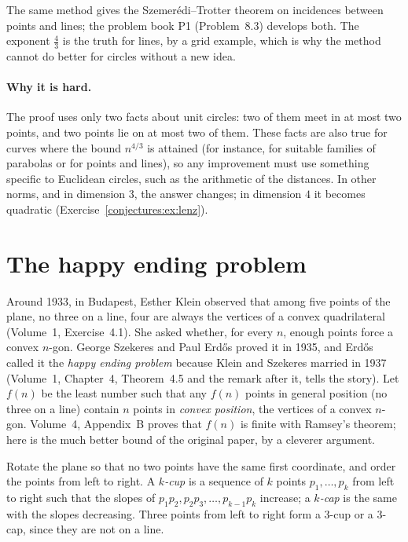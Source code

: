 The same method gives the Szemer\'edi--Trotter theorem on incidences between points and lines; the problem book P1 (Problem~8.3) develops both. The
exponent $\frac43$ is the truth for lines, by a grid example, which is why the method cannot do better for circles without a new idea.

\paragraph{Why it is hard.} The proof uses only two facts about unit circles: two of them meet in at most two points, and two points lie on at most two of
them. These facts are also true for curves where the bound $n^{4/3}$ is attained (for instance, for suitable families of parabolas or for points and
lines), so any improvement must use something specific to Euclidean circles, such as the arithmetic of the distances. In other norms, and in dimension
$3$, the answer changes; in dimension $4$ it becomes quadratic (Exercise~\ref{conjectures:ex:lenz}).

\section{The happy ending problem}

Around 1933, in Budapest, Esther Klein observed that among five points of the plane, no three on a line, four are always the vertices of a
convex quadrilateral (Volume~1, Exercise~4.1). She asked whether, for every $n$, enough points force a convex $n$-gon. George Szekeres and
Paul Erd\H os proved it in 1935, and Erd\H os called it the \emph{happy ending problem} because Klein and Szekeres married in 1937 (Volume~1, Chapter~4, Theorem~4.5 and the remark after it, tells the story). Let $f(n)$ be the least
number such that any $f(n)$ points in general position (no three on a line) contain $n$ points in \emph{convex position}, the vertices of a convex
$n$-gon. Volume~4, Appendix~B proves that $f(n)$ is finite with Ramsey's theorem; here is the much better bound of the original paper, by a cleverer argument.

Rotate the plane so that no two points have the same first coordinate, and order the points from left to right. A \emph{$k$-cup} is a sequence of $k$
points $p_1,\dots,p_k$ from left to right such that the slopes of $p_1p_2,p_2p_3,\dots,p_{k-1}p_k$ increase; a \emph{$k$-cap} is the same with the slopes
decreasing. Three points from left to right form a $3$-cup or a $3$-cap, since they are not on a line.

